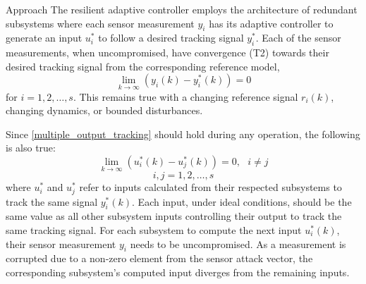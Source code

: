 \begin{section}{Approach}
The resilient adaptive controller employs the architecture of redundant subsystems where each sensor measurement $y_i$ has its adaptive controller to generate an input $u^*_i$ to follow a desired tracking signal $y^*_i$. Each of the sensor measurements, when uncompromised, have convergence (T2) towards their desired tracking signal from the corresponding reference model,
    \begin{equation}
    \label{multiple_output_tracking}
    \lim_{k\to\infty}(y_i(k)-y^*_i(k))=0
    \end{equation}
for $i=1,2,\dots,s$. This remains true with a changing reference signal $r_i(k)$, changing dynamics, or bounded disturbances. 


Since \eqref{multiple_output_tracking} should hold during any operation, the following is also true:
\begin{equation}
    \label{eq:u_to_0}
    \lim_{k\to\infty}(u^*_i(k)-u^*_j(k))=0, \text{ }i\neq j
\end{equation}
\begin{equation}
    i,j = 1,2,\dots,s \nonumber
\end{equation}
where $u^*_i$ and $u^*_j$ refer to inputs calculated from their respected subsystems to track the same signal $y_i^*(k)$. Each input, under ideal conditions, should be the same value as all other subsystem inputs controlling their output to track the same tracking signal. For each subsystem to compute the next input $u^*_i(k)$, their sensor measurement $y_i$ needs to be uncompromised. As a measurement is corrupted due to a non-zero element from the sensor attack vector, the corresponding subsystem's computed input diverges from the remaining inputs.




\end{section}
